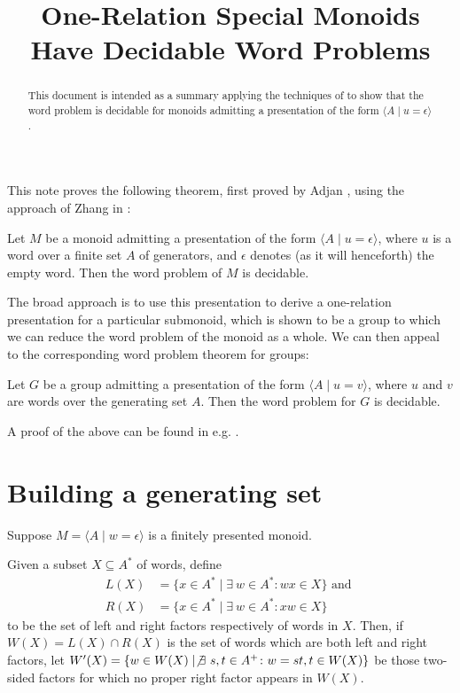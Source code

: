 \documentclass[libertine,widepage,nosubthm]{lmaths}
\title{One-Relation Special Monoids Have Decidable Word Problems}
\author{}
\date{}
\begin{document}
\maketitle

\begin{abstract}
	This document is intended as a summary applying the techniques of \cite{Zhang1992a} to show that the word problem is decidable for monoids admitting a presentation of the form $\langle A \mid u = \epsilon\rangle$.
\end{abstract}


This note proves the following theorem, first proved by Adjan \cite{Adian1966}, using the approach of Zhang in \cite{Zhang1992a}:
\begin{theorem}[Adjan]
	Let $M$ be a monoid admitting a presentation of the form $\langle A \mid u = \epsilon\rangle$, where $u$ is a word over a finite set $A$ of generators, and $\epsilon$ denotes (as it will henceforth) the empty word. Then the word problem of $M$ is decidable.
\end{theorem}

The broad approach is to use this presentation to derive a one-relation presentation for a particular submonoid, which is shown to be a group to which we can reduce the word problem of the monoid as a whole. We can then appeal to the corresponding word problem theorem for groups:
\begin{theorem}[Magnus]
	Let $G$ be a group admitting a presentation of the form $\langle A \mid u = v\rangle$, where $u$ and $v$ are words over the generating set $A$. Then the word problem for $G$ is decidable.
\end{theorem}

A proof of the above can be found in e.g. \cite{Magnus2004}.


\section{Building a generating set}

Suppose $M = \langle A \mid w = \epsilon\rangle$ is a finitely presented monoid.

Given a subset $X \subseteq A^*$ of words, define
	\begin{align*}
		L(X) &= \{ x \in A^* \mid \exists\ w \in A^* \colon wx \in X \} \text{ and } \\
		R(X) &= \{ x \in A^* \mid \exists\ w \in A^* \colon xw \in X \}
	\end{align*}
to be the set of left and right factors respectively of words in $X$. Then, if $W(X) = L(X) \cap R(X)$ is the set of words which are both left and right factors, let $W'(X) = \{ w \in W(X) \mid \not\exists\ s, t \in A^+ \colon w = st, t \in W(X) \}$ be those two-sided factors for which no proper right factor appears in $W(X)$.
\end{document}
